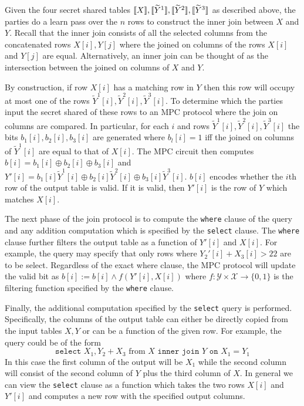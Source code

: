 Given the four secret shared tables $\llbracket X\rrbracket,\llbracket \widetilde{Y}^1\rrbracket,\llbracket \widetilde{Y}^2\rrbracket,\llbracket \widetilde{Y}^3\rrbracket$ as described above, the parties do a learn pass over the $n$ rows to construct the inner join between $X$ and $Y$. Recall that the inner join consists of all the selected columns from the concatenated rows $X[i],Y[j]$ where  the joined on columns of the rows $X[i]$ and $Y[j]$ are equal. Alternatively, an inner join can be thought of as the intersection between the joined on columns of $X$ and $Y$. 

By construction, if row $X[i]$ has a matching row in $Y$ then this row will occupy at most one of the rows ${\widetilde{Y}^1}[i],{\widetilde{Y}^2}[i],{\widetilde{Y}^3}[i]$. To determine which the parties input the secret shared of these rows to an MPC protocol where the join on columns are compared. In particular, for each $i$ and rows ${\widetilde{Y}^1}[i],{\widetilde{Y}^2}[i],{\widetilde{Y}^3}[i]$ the bits $b_1[i],b_2[i],b_3[i]$ are generated where $b_l[i]=1$ iff the joined on columns of ${\widetilde{Y}^1}[i]$ are equal to that of $X[i]$. The MPC circuit then computes $b[i]=b_1[i]\oplus b_2[i]\oplus b_3[i]$ and $Y'[i]=b_1[i]{\widetilde{Y}^1}[i]\oplus b_2[i]{\widetilde{Y}^2}[i]\oplus b_3[i]{\widetilde{Y}^3}[i]$. $b[i]$ encodes whether the $i$th row of the output table is valid. If it is valid, then $Y'[i]$ is the row of $Y$ which matches $X[i]$.

The next phase of the join protocol is to compute the \texttt{where} clause of the query and any addition computation which is specified by the \texttt{select} clause. The \texttt{where} clause further filters the output table as a function of $Y'[i]$ and $X[i]$. For example, the query may specify that only rows where $Y_2'[i] + X_3[i] > 22$  are to be select. Regardless of the exact where clause, the MPC protocol will update the valid bit as $b[i] := b[i] \wedge f(Y'[i], X[i])$ where $f: \mathcal{Y}\times \mathcal{X} \rightarrow \{0,1\}$ is the filtering function specified by the \texttt{where} clause.

Finally, the additional computation specified by the \texttt{select} query is performed. Specifically, the columns of the output table can either be directly copied from the input tables $X,Y$ or can be a function of the given row. For example, the query could be of the form 
$$
\texttt{select } X_1, Y_2 + X_3 \text{ from } X \texttt{ inner join } Y \texttt{ on } X_1 = Y_1
$$
In this case the first column of the output will be $X_1$ while the second column will consist of the second column of $Y$ plus the third column of $X$. In general we can view the \texttt{select} clause as a function which takes the two rows $X[i]$ and $Y'[i]$ and computes a new row with the specified output columns. 

